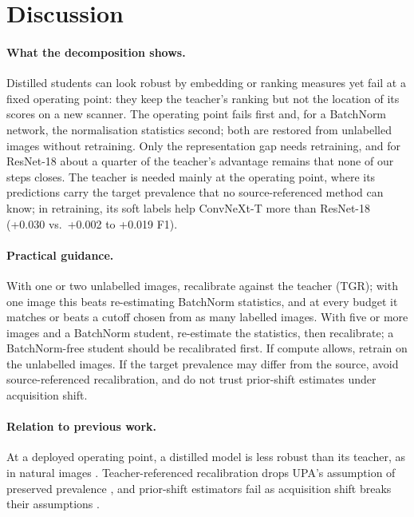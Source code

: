 \section{Discussion}
\label{sec:discussion}

\paragraph{What the decomposition shows.} Distilled students can look robust by embedding or ranking measures
\citep{filiot2025distilling} yet fail at a fixed operating point: they keep the teacher's ranking but not the location
of its scores on a new scanner. The operating point fails first and, for a BatchNorm network, the
normalisation statistics second; both are restored from unlabelled images without retraining. Only the
representation gap needs retraining, and for ResNet-18 about a quarter of the teacher's advantage remains that none of
our steps closes. The teacher is needed mainly at the operating point, where its predictions carry the target
prevalence that no source-referenced method can know; in retraining, its soft labels help ConvNeXt-T more than
ResNet-18 (+0.030 vs.\ +0.002 to +0.019 F1).

\paragraph{Practical guidance.} With one or two unlabelled images, recalibrate against the teacher
(TGR); with one image this beats re-estimating BatchNorm statistics, and at every budget it matches or beats a cutoff
chosen from as many labelled images. With five or more images and a BatchNorm student, re-estimate the statistics, then
recalibrate; a BatchNorm-free student should be recalibrated first. If compute allows, retrain on the unlabelled images.
If the target prevalence may differ from the source, avoid source-referenced recalibration, and do not trust
prior-shift estimates under acquisition shift.

\paragraph{Relation to previous work.} At a deployed operating point, a distilled model is less robust than its
teacher, as in natural images \citep{addepalli2024leveraging}. Teacher-referenced recalibration drops UPA's assumption of preserved prevalence
\citep{roschewitz2023automatic}, and prior-shift estimators fail as acquisition shift breaks their assumptions
\citep{garg2020unified}.

